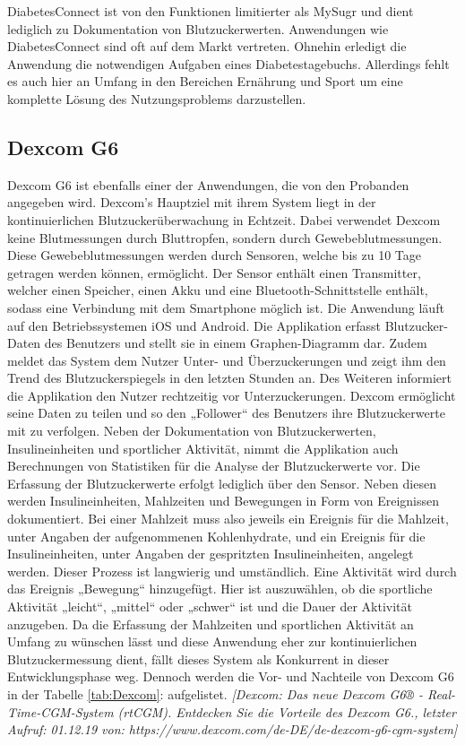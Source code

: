 \documentclass[a4paper,11pt]{article}%
\renewcommand{\\}{\vspace*{0.5\baselineskip} \newline}
\begin{document}
	\setlength{\parindent}{0pt}DiabetesConnect ist von den Funktionen limitierter als MySugr und dient lediglich zu Dokumentation von Blutzuckerwerten. Anwendungen wie DiabetesConnect sind oft auf dem Markt vertreten. Ohnehin erledigt die Anwendung die notwendigen Aufgaben eines Diabetestagebuchs. Allerdings fehlt es auch hier an Umfang in den Bereichen Ernährung und Sport um eine komplette Lösung des Nutzungsproblems darzustellen.
	\subsection{Dexcom G6}
	Dexcom G6 ist ebenfalls einer der Anwendungen, die von den Probanden angegeben wird. Dexcom’s Hauptziel mit ihrem System liegt in der kontinuierlichen Blutzuckerüberwachung in Echtzeit. Dabei verwendet Dexcom keine Blutmessungen durch Bluttropfen, sondern durch Gewebeblutmessungen. Diese Gewebeblutmessungen werden durch Sensoren, welche bis zu 10 Tage getragen werden können, ermöglicht. Der Sensor enthält einen Transmitter, welcher einen Speicher, einen Akku und eine Bluetooth-Schnittstelle enthält, sodass eine Verbindung mit dem Smartphone möglich ist. Die Anwendung läuft auf den Betriebssystemen iOS und Android. Die Applikation erfasst Blutzucker-Daten des Benutzers und stellt sie in einem Graphen-Diagramm dar. Zudem meldet das System dem Nutzer Unter- und Überzuckerungen und zeigt ihm den Trend des Blutzuckerspiegels in den letzten Stunden an. Des Weiteren informiert die Applikation den Nutzer rechtzeitig vor Unterzuckerungen. Dexcom ermöglicht seine Daten zu teilen und so den „Follower“ des Benutzers ihre Blutzuckerwerte mit zu verfolgen. Neben der Dokumentation von Blutzuckerwerten, Insulineinheiten und sportlicher Aktivität, nimmt die Applikation auch Berechnungen von Statistiken für die Analyse der Blutzuckerwerte vor. Die Erfassung der Blutzuckerwerte erfolgt lediglich über den Sensor. Neben diesen werden Insulineinheiten, Mahlzeiten und Bewegungen in Form von Ereignissen dokumentiert. Bei einer Mahlzeit muss also jeweils ein Ereignis für die Mahlzeit, unter Angaben der aufgenommenen Kohlenhydrate, und ein Ereignis für die Insulineinheiten, unter Angaben der gespritzten Insulineinheiten, angelegt werden. Dieser Prozess ist langwierig und umständlich. Eine Aktivität wird durch das Ereignis „Bewegung“ hinzugefügt. Hier ist auszuwählen, ob die sportliche Aktivität „leicht“, „mittel“ oder „schwer“ ist und die Dauer der Aktivität anzugeben. Da die Erfassung der Mahlzeiten und sportlichen Aktivität an Umfang zu wünschen lässt und diese Anwendung eher zur kontinuierlichen Blutzuckermessung dient, fällt dieses System als Konkurrent in dieser Entwicklungsphase weg. Dennoch werden die Vor- und Nachteile von Dexcom G6 in der Tabelle \ref{tab:Dexcom}:  aufgelistet. \emph{[Dexcom: Das neue Dexcom G6® - Real-Time-CGM-System (rtCGM). Entdecken Sie die Vorteile des Dexcom G6., letzter Aufruf: 01.12.19 von: https://www.dexcom.com/de-DE/de-dexcom-g6-cgm-system]}
\end{document}
